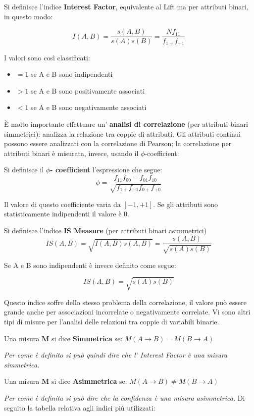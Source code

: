 \begin{defn}
	Si definisce l'indice \textbf{Interest Factor}, equivalente al Lift ma per attributi binari, in questo modo:
	
	\[ I(A,B)  = \frac{s(A,B)}{s(A)s(B)} = \frac{Nf_{11}}{f_{1+}f_{+1}}\]
\end{defn}
I valori sono così classificati:
\begin{itemize}
	\item $=1$ se A e B sono indipendenti
	\item $>1$ se A e B sono positivamente associati
	\item $<1$ se A e B sono negativamente associati
\end{itemize}
	
\`E molto importante effettuare un' \textbf{analisi di correlazione} (per attributi binari simmetrici): analizza la relazione tra coppie di attributi. Gli attributi continui possono essere analizzati con la correlazione di Pearson; la correlazione per attributi binari è misurata, invece,  usando il $\phi$-coefficient:
\begin{defn}
	Si definisce il \textbf{$\phi$- coefficient} l'espressione che segue:
	\[\phi = \frac{f_{11}f_{00} - f_{01}f_{10}}{\sqrt{f_{1+}f_{+1}f_{0+}f_{+0}}}\]
\end{defn}
Il valore di questo coefficiente varia da $[-1,+1]$. Se gli attributi sono statisticamente indipendenti il valore è $0$.

\begin{defn}
	Si definisce l'indice \textbf{IS Measure} (per attributi binari asimmetrici)	
	\[IS(A,B) = \sqrt{I(A,B)s(A,B)} = \frac{s(A,B)}{\sqrt{s(A)s(B)}}\]
	
	Se A e B sono indipendenti è invece definito come segue:
	
	\[IS(A,B) = \sqrt{s(A)s(B)}\]
	

\end{defn}
Questo indice soffre dello stesso problema della correlazione, il valore può essere grande anche per associazioni incorrelate o negativamente correlate.
Vi sono altri tipi di misure per l'analisi delle relazioni tra coppie di variabili binarie.

\begin{defn}
Una misura \textbf{M} si dice \textbf{Simmetrica} se: $M(A \rightarrow B) = M(B \rightarrow A)$
\end{defn}
\textit{Per come è definito si può quindi dire che l' Interest Factor è una misura simmetrica.}

\begin{defn}
	
Una misura \textbf{M} si dice \textbf{Asimmetrica} se: $M(A \rightarrow B) \ne M(B \rightarrow A)$

\end{defn}
\textit{Per come è definita si può dire che la confidenza è una misura asimmetrica.}
Di seguito la tabella relativa agli indici più utilizzati:


